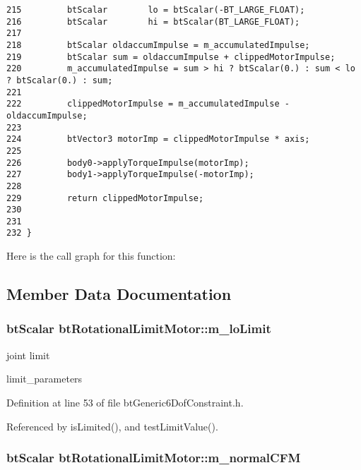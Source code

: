 \begin{Code}
\begin{verbatim}
215         btScalar        lo = btScalar(-BT_LARGE_FLOAT);
216         btScalar        hi = btScalar(BT_LARGE_FLOAT);
217 
218         btScalar oldaccumImpulse = m_accumulatedImpulse;
219         btScalar sum = oldaccumImpulse + clippedMotorImpulse;
220         m_accumulatedImpulse = sum > hi ? btScalar(0.) : sum < lo ? btScalar(0.) : sum;
221 
222         clippedMotorImpulse = m_accumulatedImpulse - oldaccumImpulse;
223 
224         btVector3 motorImp = clippedMotorImpulse * axis;
225 
226         body0->applyTorqueImpulse(motorImp);
227         body1->applyTorqueImpulse(-motorImp);
228 
229         return clippedMotorImpulse;
230 
231 
232 }
\end{verbatim}
\end{Code}




Here is the call graph for this function:

\subsection{Member Data Documentation}
\hypertarget{classbt_rotational_limit_motor_57ff414e1856d661d81b797702c4f986}{
\subsubsection[m\_\-loLimit]{\setlength{\rightskip}{0pt plus 5cm}btScalar {\bf btRotationalLimitMotor::m\_\-loLimit}}}
\label{classbt_rotational_limit_motor_57ff414e1856d661d81b797702c4f986}


joint limit 

limit\_\-parameters 

Definition at line 53 of file btGeneric6DofConstraint.h.

Referenced by isLimited(), and testLimitValue().\hypertarget{classbt_rotational_limit_motor_3d06f5a5de013fd97f39cf63273dce45}{
\subsubsection[m\_\-normalCFM]{\setlength{\rightskip}{0pt plus 5cm}btScalar {\bf btRotationalLimitMotor::m\_\-normalCFM}}}
\label{classbt_rotational_limit_motor_3d06f5a5de013fd97f39cf63273dce45}


